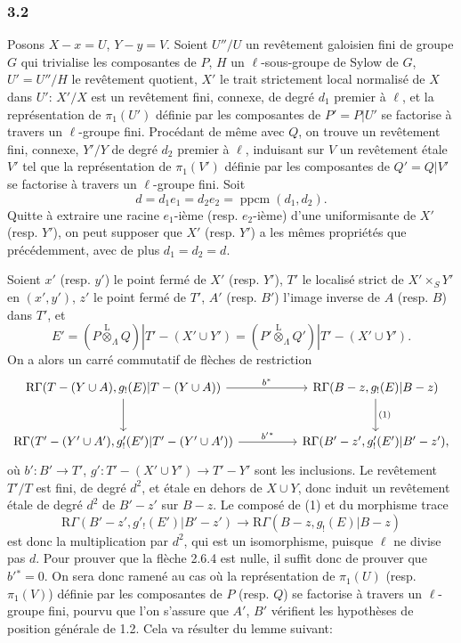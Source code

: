 \documentclass[11pt]{article}
\providecommand{\lten}{\overset{\mathrm L}{\otimes}}
\providecommand{\lten}{\overset{\mathrm L}{\otimes}}
\providecommand{\lten}{\overset{\mathrm L}{\otimes}}
\providecommand{\lten}{\overset{\mathrm L}{\otimes}}
\providecommand{\lten}{\overset{\mathrm L}{\otimes}}
\providecommand{\lten}{\overset{\mathrm L}{\otimes}}
\begin{document}
\subsubsection*{3.2}
Posons $X-x=U$, $Y-y=V$. Soient $U''/U$ un revêtement galoisien fini de groupe $G$ qui trivialise les composantes de $P$, $H$ un $\ell$-sous-groupe de Sylow de $G$, $U'=U''/H$ le revêtement quotient, $X'$ le trait strictement local normalisé de $X$ dans $U'$: $X'/X$ est un revêtement fini, connexe, de degré $d_1$ premier à $\ell$, et la représentation de $\pi_1(U')$ définie par les composantes de $P'=P|U'$ se factorise à travers un $\ell$-groupe fini. Procédant de même avec $Q$, on trouve un revêtement fini, connexe, $Y'/Y$ de degré $d_2$ premier à $\ell$, induisant sur $V$ un revêtement étale $V'$ tel que la représentation de $\pi_1(V')$ définie par les composantes de $Q'=Q|V'$ se factorise à travers un $\ell$-groupe fini. Soit
\[
d=d_1e_1=d_2e_2=\operatorname{ppcm}(d_1,d_2).
\]
Quitte à extraire une racine $e_1$-ième (resp. $e_2$-ième) d'une uniformisante de $X'$ (resp. $Y'$), on peut supposer que $X'$ (resp. $Y'$) a les mêmes propriétés que précédemment, avec de plus $d_1=d_2=d$.

Soient $x'$ (resp. $y'$) le point fermé de $X'$ (resp. $Y'$), $T'$ le localisé strict de $X'\times_S Y'$ en $(x',y')$, $z'$ le point fermé de $T'$, $A'$ (resp. $B'$) l'image inverse de $A$ (resp. $B$) dans $T'$, et
\[
E'=(P\lten_{\Lambda}Q)|T'-(X'\cup Y')
   =(P'\lten_{\Lambda}Q')|T'-(X'\cup Y').
\]
On a alors un carré commutatif de flèches de restriction
\[
\begin{tikzcd}[column sep=huge,row sep=large]
\mathrm R\Gamma(T-(Y\cup A),g_!(E)|T-(Y\cup A))
 \arrow[r,"b^*"] \arrow[d]
&
\mathrm R\Gamma(B-z,g_!(E)|B-z) \arrow[d,"(1)"]\\
\mathrm R\Gamma(T'-(Y'\cup A'),g'_!(E')|T'-(Y'\cup A'))
 \arrow[r,"b'{}^*"]
&
\mathrm R\Gamma(B'-z',g'_!(E')|B'-z') ,
\end{tikzcd}
\]
où $b':B'\to T'$, $g':T'-(X'\cup Y')\to T'-Y'$ sont les inclusions. Le revêtement $T'/T$ est fini, de degré $d^2$, et étale en dehors de $X\cup Y$, donc induit un revêtement étale de degré $d^2$ de $B'-z'$ sur $B-z$. Le composé de (1) et du morphisme trace
\[
\mathrm R\Gamma(B'-z',g'_!(E')|B'-z')
 \longrightarrow
\mathrm R\Gamma(B-z,g_!(E)|B-z)
\]
est donc la multiplication par $d^2$, qui est un isomorphisme, puisque $\ell$ ne divise pas $d$. Pour prouver que la flèche 2.6.4 est nulle, il suffit donc de prouver que $b'{}^*=0$. On sera donc ramené au cas où la représentation de $\pi_1(U)$ (resp. $\pi_1(V)$) définie par les composantes de $P$ (resp. $Q$) se factorise à travers un $\ell$-groupe fini, pourvu que l'on s'assure que $A'$, $B'$ vérifient les hypothèses de position générale de 1.2. Cela va résulter du lemme suivant:
\end{document}
